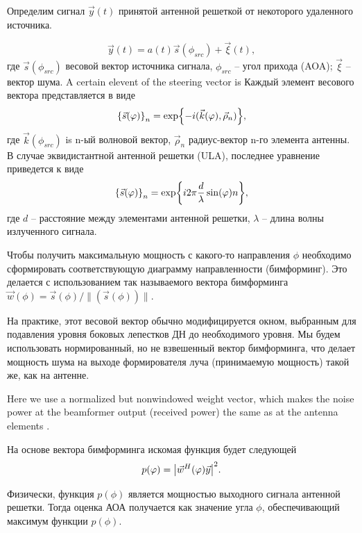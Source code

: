 Определим сигнал $\vec{y}(t)$ принятой антенной решеткой от некоторого
удаленного источника.

\begin{equation}
    \label{eq:3.1}
    \vec{y}(t) = a(t) \vec{s}(\phi_{src}) + \vec{\xi}(t),
\end{equation}
где ${\vec{s}(\phi_{src})}$ весовой вектор источника сигнала,
$\phi_{src}$ -- угол прихода (AOA); $\vec \xi$ -- вектор шума.
A certain elevent of the steering vector is 
Каждый элемент весового вектора представляется в виде
\begin{equation}
    \qty{\vec{s}(\varphi)}_n = \exp{-i(\vec k (\varphi), \vec \rho_n)},
\end{equation}
где $\vec k (\phi_{src})$ is n-ый волновой вектор, $\vec\rho_n$ радиус-вектор
n-го элемента антенны. 
В случае эквидистантной антенной решетки (ULA), последнее уравнение приведется
к виде
\begin{equation}
    \qty{\vec s(\varphi)}_n = \exp{i2\pi\frac{d}{\lambda}\sin(\varphi)n},
\end{equation}
где $d$ -- расстояние между элементами антенной решетки, $\lambda$ -- длина
волны излученного сигнала.

Чтобы получить максимальную мощность с какого-то направления
$\phi$ необходимо сформировать соответствующую диаграмму направленности
(бимформинг). Это делается с использованием так называемого вектора бимформинга
$\vec w (\phi) = \vec s(\phi)/\rVert(\vec s(\phi))\lVert$.

На практике, этот весовой вектор обычно модифицируется окном, выбранным
для подавления уровня боковых лепестков ДН до необходимого уровня. Мы будем
использовать нормированный, но не взвешенный вектор бимформинга, что делает
мощность шума на выходе формирователя луча (принимаемую мощность) такой же, как
на антенне.

Here we use a normalized but nonwindowed weight vector,
which makes the noise power at the beamformer output (received power) the same as at the antenna
elements \cite{Tuncer2009}. 

На основе вектора бимформинга искомая функция будет следующей
\begin{equation}
    p(\varphi) = \abs{\vec w^H (\varphi) \vec y}^2.
\end{equation}

Физически, функция $p(\phi)$  является мощностью выходного сигнала антенной
решетки. Тогда оценка АОА получается как значение угла
$\phi$, обеспечивающий максимум функции $p(\phi)$.

